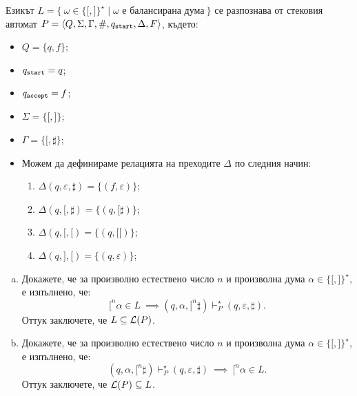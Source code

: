 \begin{extra}
\begin{example}
  Езикът $L = \{\ \omega \in \{\texttt{[},\texttt{]}\}^\star \mid \omega\text{ е балансирана дума}\ \}$ се разпознава от стековия автомат $P = \langle{Q,\Sigma,\Gamma,\#,q_{\texttt{start}},\Delta,F}\rangle$, където:
  \begin{itemize}
  \item 
    $Q = \{q,f\}$;
  \item
    $q_{\texttt{start}} = q$;
  \item
    $q_{\texttt{accept}} = f$;
  \item
    $\Sigma = \{\texttt{[},\texttt{]}\}$;
  \item
    $\Gamma = \{\texttt{[}, \sharp\}$;
  \item
    Можем да дефинираме релацията на преходите $\Delta$ по следния начин:
    \begin{enumerate}[(1)]
    \item 
      $\Delta(q, \varepsilon, \sharp) = \{(f, \varepsilon)\}$;
    \item
      $\Delta(q, \texttt{[}, \sharp) = \{(q, \texttt{[}\sharp)\}$;
    \item
      $\Delta(q, \texttt{[}, \texttt{[}) = \{(q, \texttt{[[})\}$;
    \item
      $\Delta(q, \texttt{]}, \texttt{[}) = \{(q, \varepsilon)\}$;
    \end{enumerate}
  \end{itemize}  
  \begin{enumerate}[(a)]
  \item
    Докажете, че за произволно естествено число $n$ и произволна дума $\alpha \in \{\texttt{[}, \texttt{]}\}^\star$, 
    е изпълнено, че:
    \[\texttt{[}^n\alpha \in L\ \implies (q, \alpha, \texttt{[}^n\sharp) \vdash^\star_P (q, \varepsilon, \sharp).\]
    Оттук заключете, че $L \subseteq \mathcal{L}(P)$.
  \item
    Докажете, че за произволно естествено число $n$ и произволна дума $\alpha \in \{\texttt{[}, \texttt{]}\}^\star$, е изпълнено, че:
    \[(q,\alpha,\texttt{[}^n\sharp) \vdash^\star_P (q, \varepsilon, \sharp)\ \implies\ \texttt{[}^n\alpha \in L.\]
    Оттук заключете, че $\mathcal{L}(P) \subseteq L$.
  \end{enumerate}
\end{example}
\end{extra}

